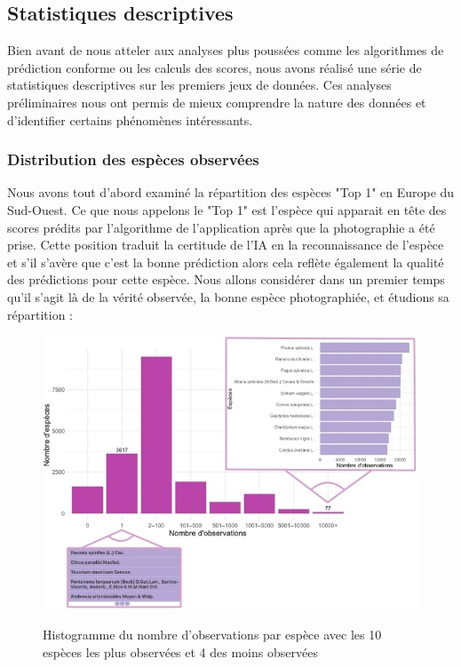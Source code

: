 \documentclass[a4paper,12pt]{article}
\begin{document}

\subsection{Statistiques descriptives}

Bien avant de nous atteler aux analyses plus poussées comme les algorithmes de prédiction conforme ou les calculs des scores, nous avons réalisé une série de statistiques descriptives sur les premiers jeux de données. Ces analyses préliminaires nous ont permis de mieux comprendre la nature des données et d'identifier certains phénomènes intéressants.

\subsubsection{Distribution des espèces observées}

Nous avons tout d'abord examiné la répartition des espèces "Top 1" en Europe du Sud-Ouest. Ce que nous appelons le "Top 1" est l'espèce qui apparait en tête des scores prédits par l'algorithme de l'application après que la photographie a été prise. Cette position traduit la certitude de l'IA en la reconnaissance de l'espèce et s'il s'avère que c'est la bonne prédiction alors cela reflète également la qualité des prédictions pour cette espèce. Nous allons considérer dans un premier temps qu'il s'agit là de la vérité observée, la bonne espèce photographiée, et étudions sa répartition :

\begin{figure}[H]
\centering
\includegraphics[width=\linewidth]{images/figure1.jpg}
\label{fig1}
\caption{Histogramme du nombre d'observations par espèce avec les 10 espèces les plus observées et 4 des moins observées}
\end{figure}
\end{document}
